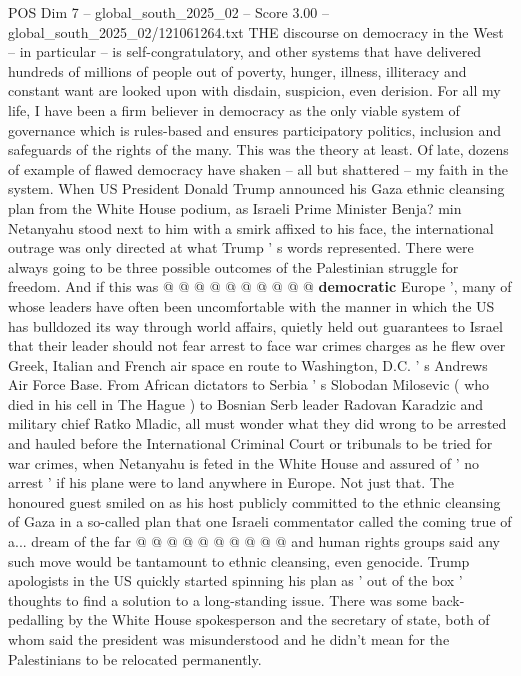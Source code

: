 \begin{textsample}{POS Dim 7 – global\_south\_2025\_02 – Score 3.00 – global\_south\_2025\_02/121061264.txt}  \label{ex:f7_pos_424}
THE discourse on democracy in the West -- in particular -- is self-congratulatory, and other systems that have delivered hundreds of millions of people out of poverty, hunger, illness, illiteracy and constant want are looked upon with disdain, suspicion, even derision.
For all my life, I have been a firm believer in democracy as the only viable system of governance which is rules-based and ensures participatory politics, inclusion and safeguards of the rights of the many.
This was the theory at least.
Of late, dozens of example of flawed democracy have shaken -- all but shattered -- my faith in the system.
When US President Donald Trump announced his Gaza ethnic cleansing plan from the White House podium, as Israeli Prime Minister Benja? min Netanyahu stood next to him with a smirk affixed to his face, the international outrage was only directed at what Trump ' s words represented.
There were always going to be three possible outcomes of the Palestinian struggle for freedom.
And if this was @ @ @ @ @ @ @ @ @ @ \textbf{democratic} Europe ', many of whose leaders have often been uncomfortable with the manner in which the US has bulldozed its way through world affairs, quietly held out guarantees to Israel that their leader should not fear arrest to face war crimes charges as he flew over Greek, Italian and French air space en route to Washington, D.C. ' s Andrews Air Force Base.
From African dictators to Serbia ' s Slobodan Milosevic ( who died in his cell in The Hague ) to Bosnian Serb leader Radovan Karadzic and military chief Ratko Mladic, all must wonder what they did wrong to be arrested and hauled before the International Criminal Court or tribunals to be tried for war crimes, when Netanyahu is feted in the White House and assured of ' no arrest ' if his plane were to land anywhere in Europe.
Not just that.
The honoured guest smiled on as his host publicly committed to the ethnic cleansing of Gaza in a so-called plan that one Israeli commentator called the coming true of a... dream of the far @ @ @ @ @ @ @ @ @ @ and human rights groups said any such move would be tantamount to ethnic cleansing, even genocide.
Trump apologists in the US quickly started spinning his plan as ' out of the box ' thoughts to find a solution to a long-standing issue.
There was some back-pedalling by the White House spokesperson and the secretary of state, both of whom said the president was misunderstood and he didn't mean for the Palestinians to be relocated permanently.

\end{textsample}
